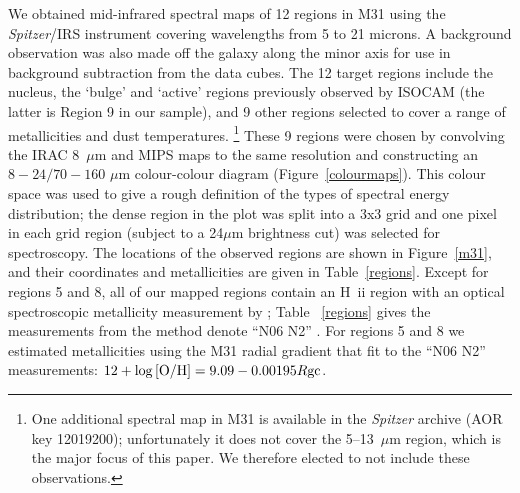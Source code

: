 We obtained mid-infrared spectral maps of 12 regions in M31 using the {\em Spitzer}/IRS instrument \citep{IRS2004} covering wavelengths from 5 to 21 microns. 
A background observation was also made off the galaxy 
along the minor axis for use in background subtraction from the data cubes.
The 12 target regions include the nucleus, the `bulge' and `active' regions previously observed by ISOCAM (the latter is Region 9 in our sample), 
and 9 other regions selected to cover a range of metallicities and dust temperatures.%
\footnote{One additional spectral map in M31 is available in the {\it Spitzer} archive (AOR key 12019200);
unfortunately it does not cover the 5--13~$\mu$m region, which is the major focus of this paper. We therefore elected to not include these observations.} 
These 9 regions were chosen by convolving the IRAC 8~$\mu$m \citep{Barmby2006lr}
and MIPS \citep{gordon06a} maps to the same resolution and constructing an $8 - 24/70 - 160$ $\mu$m colour-colour diagram (Figure~\ref{colourmaps}).
This colour space was used to give a rough definition of the types of spectral energy distribution; the 
dense region in the plot was split into a 3x3 grid and one pixel in each grid region (subject to a 24$\mu$m brightness cut)
was selected for spectroscopy. 
The locations of the observed regions are shown in Figure~\ref{m31}, and 
their coordinates and metallicities are given in Table~\ref{regions}.  
Except for regions 5 and 8, all of our mapped regions contain an  H~{\sc ii} region with
an optical spectroscopic metallicity measurement by \citet{Sanders_2011}; Table ~\ref{regions} gives the measurements from the method 
\citet{Sanders_2011} denote ``N06 N2''  \citep{Nagao2006}. For regions 5 and 8 we estimated metallicities using the M31 radial gradient
that  \citet{Sanders_2011} fit to the ``N06 N2'' measurements: $12+\log{\rm [O/H]} = 9.09 - 0.00195 R{\rm gc}$.

